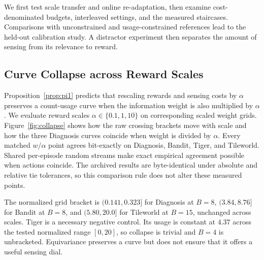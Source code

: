 \documentclass[runningheads]{llncs}
\begin{document}
We first test scale transfer and online re-adaptation, then examine cost-denominated budgets, interleaved settings, and the measured staircases. Comparisons with unconstrained and usage-constrained references lead to the held-out calibration study. A distractor experiment then separates the amount of sensing from its relevance to reward.

\subsection{Curve Collapse across Reward Scales}
\label{sec:collapse}

Proposition~\ref{prop:pi1} predicts that rescaling rewards and sensing costs by $\alpha$ preserves a count-usage curve when the information weight is also multiplied by $\alpha$. We evaluate reward scales $\alpha\in\{0.1,1,10\}$ on corresponding scaled weight grids. Figure~\ref{fig:collapse} shows how the raw crossing brackets move with scale and how the three Diagnosis curves coincide when weight is divided by $\alpha$. Every matched $w/\alpha$ point agrees bit-exactly on Diagnosis, Bandit, Tiger, and Tileworld. Shared per-episode random streams make exact empirical agreement possible when actions coincide. The archived results are byte-identical under absolute and relative tie tolerances, so this comparison rule does not alter these measured points.

The normalized grid bracket is $(0.141,0.323]$ for Diagnosis at $B{=}8$, $(3.84,8.76]$ for Bandit at $B{=}8$, and $(5.80,20.0]$ for Tileworld at $B{=}15$, unchanged across scales. Tiger is a necessary negative control. Its usage is constant at $4.37$ across the tested normalized range $[0,20]$, so collapse is trivial and $B{=}4$ is unbracketed. Equivariance preserves a curve but does not ensure that it offers a useful sensing dial.
\end{document}
